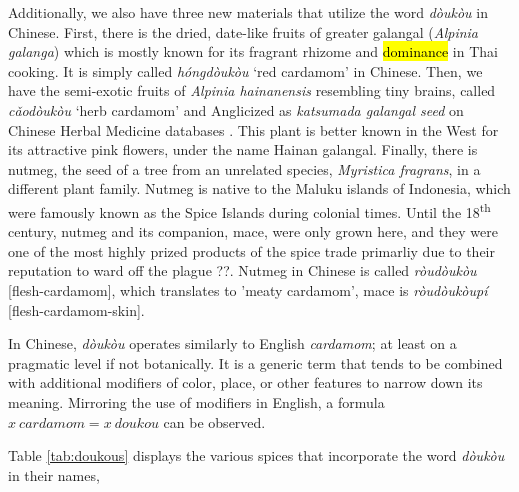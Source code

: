 \documentclass[12pt]{article}
\begin{document}
Additionally, we also have three new materials that utilize the word \textit{dòukòu} in Chinese. First, there is the dried, date-like fruits of greater galangal (\textit{Alpinia galanga}) which is mostly known for its fragrant rhizome and \hl{dominance} in Thai cooking. It is simply called \textit{hóngdòukòu} `red cardamom' in Chinese. Then, we have the semi-exotic fruits of \textit{Alpinia hainanensis} resembling tiny brains, called \textit{cǎodòukòu} `herb cardamom' and Anglicized as \textit{katsumada galangal seed} on Chinese Herbal Medicine databases \parencite[cf.][]{polyu_2022_chinese}. This plant is better known in the West for its attractive pink flowers, under the name Hainan galangal. Finally, there is nutmeg, the seed of a tree from an unrelated species, \textit{Myristica fragrans}, in a different plant family. Nutmeg is native to the Maluku islands of Indonesia, which were famously known as the Spice Islands during colonial times. Until the 18\textsuperscript{th} century, nutmeg and its companion, mace, were only grown here, and they were one of the most highly prized products of the spice trade primarliy due to their reputation to ward off the plague ??.
Nutmeg in Chinese is called \textit{ròudòukòu} [flesh-cardamom], which translates to 'meaty cardamom', mace is \textit{ròudòukòupí}	[flesh-cardamom-skin].

In Chinese, \textit{dòukòu} operates similarly to English \textit{cardamom}; at least on a pragmatic level if not botanically. It is a generic term that tends to be combined with additional modifiers of color, place, or other features to narrow down its meaning. Mirroring the use of modifiers in English, a formula $x~cardamom = x~doukou$ can be observed. 

Table \ref{tab:doukous} displays the various spices that incorporate the word \textit{dòukòu} in their names, 



\end{document}
